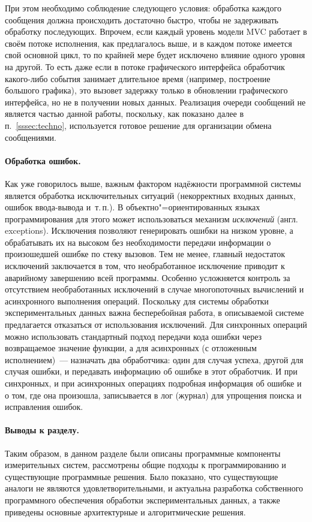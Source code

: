 \documentclass[a4paper, 14pt, titlepage]{extarticle}
\newcommand{\eng}[1]{\foreignlanguage{english}{#1}}
\newcommand{\term}[1]{\emph{#1}}
\begin{document}
  При этом необходимо соблюдение следующего условия: обработка каждого сообщения должна происходить
  достаточно быстро, чтобы не задерживать обработку
  последующих. Впрочем, если каждый уровень модели MVC работает в своём потоке исполнения, как
  предлагалось выше, и в каждом потоке имеется свой основной цикл, то по крайней мере будет
  исключено влияние одного уровня на другой. То есть даже если в потоке графического интерфейса
  обработчик какого-либо события занимает длительное время (например, построение большого графика),
  это вызовет задержку только в обновлении графического интерфейса, но не в получении новых данных.
  Реализация очереди сообщений не является частью данной работы, поскольку, как показано далее
  в п.~\ref{sssec:techno}, используется готовое решение для организации обмена сообщениями.

  \paragraph{Обработка ошибок.} Как уже говорилось выше, важным фактором надёжности программной
  системы является обработка исключительных ситуаций (некорректных входных данных, ошибок
  ввода-вывода и~т.\,п.). В объектно"=ориентированных языках программирования для этого может
  использоваться механизм \term{исключений} (англ. \eng{exceptions}).
  Исключения позволяют генерировать ошибки на низком уровне, а обрабатывать их на высоком без
  необходимости передачи информации о произошедшей ошибке по стеку вызовов.
  Тем не менее, главный недостаток исключений заключается в том, что необработанное исключение
  приводит к аварийному завершению всей программы. Особенно усложняется контроль за отсутствием
  необработанных исключений в случае многопоточных вычислений и асинхронного выполнения операций.
  Поскольку для системы обработки экспериментальных данных важна бесперебойная работа, в описываемой
  системе предлагается отказаться от использования исключений. Для синхронных операций можно
  использовать стандартный подход передачи кода ошибки через возвращаемое значение функции, а для
  асинхронных (с отложенным исполнением)~--- назначать два обработчика: один для случая успеха,
  другой для случая ошибки, и передавать информацию об ошибке в этот обработчик. И при синхронных, и
  при асинхронных операциях подробная информация об ошибке и о том, где она произошла, записывается в
  лог (журнал) для упрощения поиска и исправления ошибок.


  \paragraph{Выводы к разделу.}
  Таким образом, в данном разделе были описаны программные компоненты измерительных систем,
  рассмотрены общие подходы к программированию и существующие программные решения. Было показано,
  что существующие аналоги не являются удовлетворительными, и актуальна разработка собственного
  программного обеспечения обработки экспериментальных данных, а также приведены основные
  архитектурные и алгоритмические решения.
\end{document}
